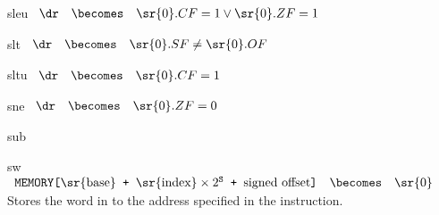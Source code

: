 \begin{instruction}{sleu}
     {\sleuopc}
     {
       \begin{math}
         \begin{array}{lcl}
           \dr & \becomes & \sr{0}.CF = 1 \vee \sr{0}.ZF = 1 \\
         \end{array}
       \end{math}
     }
\end{instruction}


\begin{instruction}{slt}
     {\sltopc}
     {
       \begin{math}
         \begin{array}{lcl}
           \dr & \becomes & \sr{0}.SF \neq \sr{0}.OF \\
         \end{array}
       \end{math}
     }
\end{instruction}

\begin{instruction}{sltu}
     {\sltuopc}
     {
       \begin{math}
         \begin{array}{lcl}
           \dr & \becomes & \sr{0}.CF = 1 \\
         \end{array}
       \end{math}
     }
\end{instruction}

\begin{instruction}{sne}
     {\sneopc}
     {
       \begin{math}
         \begin{array}{lcl}
           \dr & \becomes & \sr{0}.ZF = 0 \\
         \end{array}
       \end{math}
     }
\end{instruction}



\begin{instruction}{sub}
\end{instruction}


\begin{instruction}{sw}
     {\swopc}
     {
       \begin{math}
         \begin{array}{lcl}
           \texttt{MEMORY[\textrm{\sr{base}} + \(\textrm{\sr{index}}
               \times 2^\texttt{S}\) +  \textrm{signed offset}]}
           & \becomes & {\sr{0}}
         \end{array}
       \end{math}
     }
     {
       Stores the word in  to the address specified in the instruction.
     }
\end{instruction}


